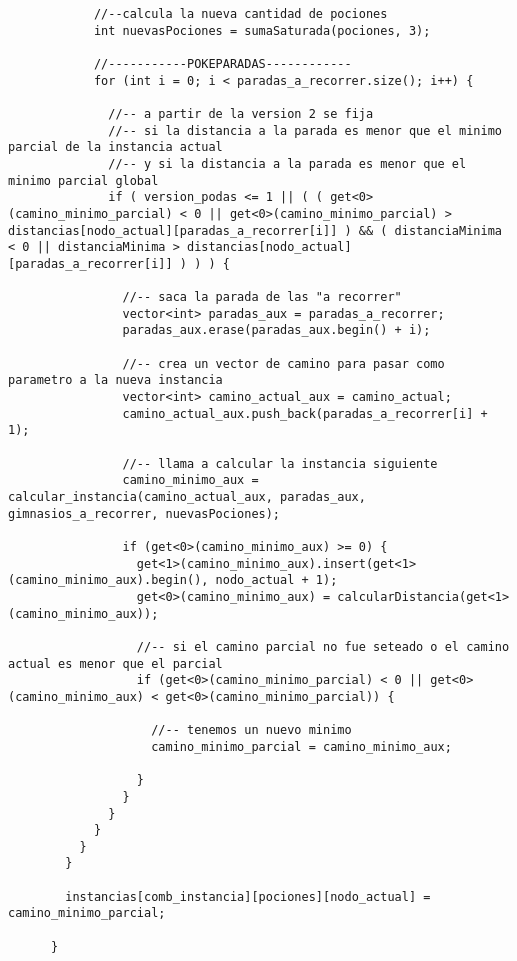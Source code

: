 \begin{lstlisting}
            //--calcula la nueva cantidad de pociones
            int nuevasPociones = sumaSaturada(pociones, 3);
            
            //-----------POKEPARADAS------------
            for (int i = 0; i < paradas_a_recorrer.size(); i++) {

              //-- a partir de la version 2 se fija
              //-- si la distancia a la parada es menor que el minimo parcial de la instancia actual
              //-- y si la distancia a la parada es menor que el minimo parcial global
              if ( version_podas <= 1 || ( ( get<0>(camino_minimo_parcial) < 0 || get<0>(camino_minimo_parcial) > distancias[nodo_actual][paradas_a_recorrer[i]] ) && ( distanciaMinima < 0 || distanciaMinima > distancias[nodo_actual][paradas_a_recorrer[i]] ) ) ) {

                //-- saca la parada de las "a recorrer"
                vector<int> paradas_aux = paradas_a_recorrer;
                paradas_aux.erase(paradas_aux.begin() + i);

                //-- crea un vector de camino para pasar como parametro a la nueva instancia
                vector<int> camino_actual_aux = camino_actual;
                camino_actual_aux.push_back(paradas_a_recorrer[i] + 1);

                //-- llama a calcular la instancia siguiente
                camino_minimo_aux = calcular_instancia(camino_actual_aux, paradas_aux, gimnasios_a_recorrer, nuevasPociones);

                if (get<0>(camino_minimo_aux) >= 0) {
                  get<1>(camino_minimo_aux).insert(get<1>(camino_minimo_aux).begin(), nodo_actual + 1);
                  get<0>(camino_minimo_aux) = calcularDistancia(get<1>(camino_minimo_aux));

                  //-- si el camino parcial no fue seteado o el camino actual es menor que el parcial
                  if (get<0>(camino_minimo_parcial) < 0 || get<0>(camino_minimo_aux) < get<0>(camino_minimo_parcial)) {
                    
                    //-- tenemos un nuevo minimo
                    camino_minimo_parcial = camino_minimo_aux;
                  
                  }
                }
              }
            }
          }
        }

        instancias[comb_instancia][pociones][nodo_actual] = camino_minimo_parcial;
      
      }


\end{lstlisting}
